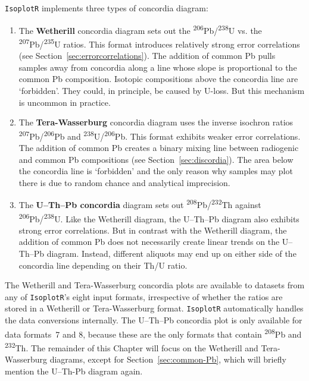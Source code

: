\begin{refsection}
\texttt{IsoplotR} implements three types of concordia diagram:

\begin{enumerate}
\item The \textbf{Wetherill} concordia diagram sets out the
  \textsuperscript{206}Pb/\textsuperscript{238}U vs. the
  \textsuperscript{207}Pb/\textsuperscript{235}U ratios. This format
  introduces relatively strong error correlations (see
  Section~\ref{sec:errorcorrelations}). The addition of common Pb
  pulls samples away from concordia along a line whose slope is
  proportional to the common Pb composition. Isotopic compositions
  above the concordia line are `forbidden'. They could, in principle,
  be caused by U-loss. But this mechanism is uncommon in practice.
\item The \textbf{Tera-Wasserburg} concordia diagram uses the inverse
  isochron ratios \textsuperscript{207}Pb/\textsuperscript{206}Pb and
  \textsuperscript{238}U/\textsuperscript{206}Pb. This format exhibits
  weaker error correlations. The addition of common Pb creates a
  binary mixing line between radiogenic and common Pb compositions
  (see Section~\ref{sec:discordia}). The area below the concordia line
  is `forbidden' and the only reason why samples may plot there is due
  to random chance and analytical imprecision.
\item The \textbf{U--Th--Pb concordia} diagram sets out
  \textsuperscript{208}Pb/\textsuperscript{232}Th against
  \textsuperscript{206}Pb/\textsuperscript{238}U. Like the Wetherill
  diagram, the U--Th--Pb diagram also exhibits strong error
  correlations.  But in contrast with the Wetherill diagram, the
  addition of common Pb does not necessarily create linear trends on
  the U--Th--Pb diagram. Instead, different aliquots may end up on
  either side of the concordia line depending on their Th/U ratio.
\end{enumerate}

The Wetherill and Tera-Wasserburg concordia plots are available to
datasets from any of \texttt{IsoplotR}'s eight input formats,
irrespective of whether the ratios are stored in a Wetherill or
Tera-Wasserburg format. \texttt{IsoplotR} automatically handles the
data conversions internally. The U--Th--Pb concordia plot is only
available for data formats~7 and 8, because these are the only formats
that contain \textsuperscript{208}Pb and \textsuperscript{232}Th.  The
remainder of this Chapter will focus on the Wetherill and
Tera-Wasserburg diagrams, except for Section~\ref{sec:common-Pb},
which will briefly mention the U--Th-Pb diagram again.\\


\end{refsection}
